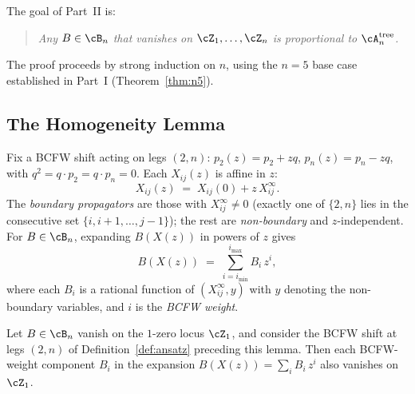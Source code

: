 The goal of Part~II is:

\begin{quote}
  \emph{Any $B \in \cB_n$ that vanishes on
  $\cZ_1, \ldots, \cZ_n$ is proportional to $\cA_n^{\mathrm{tree}}$.}
\end{quote}

\noindent
The proof proceeds by strong induction on $n$, using
the $n = 5$ base case established in Part~I (Theorem~\ref{thm:n5}).

\subsection{The Homogeneity Lemma}
\label{ssec:homogeneity}

\begin{definition}
Fix a BCFW shift acting on legs $(2,n)$:
$p_2(z) = p_2 + zq$, $p_n(z) = p_n - zq$, with
$q^2 = q\cdot p_2 = q\cdot p_n = 0$.
Each $X_{ij}(z)$ is affine in $z$:
\begin{equation}
  X_{ij}(z) \;=\; X_{ij}(0) + z\, X_{ij}^\infty.
  \label{eq:Xz}
\end{equation}
The \emph{boundary propagators} are those with
$X_{ij}^\infty \ne 0$ (exactly one of $\{2, n\}$ lies
in the consecutive set $\{i, i{+}1, \ldots, j{-}1\}$);
the rest are \emph{non-boundary} and $z$-independent.
For $B \in \cB_n$, expanding $B(X(z))$ in powers of $z$ gives
\[
  B(X(z)) \;=\; \sum_{i=i_{\min}}^{i_{\max}} B_i\, z^i,
\]
where each $B_i$ is a rational function of
$(X_{ij}^\infty, y)$ with $y$ denoting the non-boundary
variables, and $i$ is the \emph{BCFW weight}.
\end{definition}

\begin{lemma}
\label{lem:homogeneity}
Let $B \in \cB_n$ vanish on the $1$-zero locus $\cZ_1$,
and consider the BCFW shift at legs $(2, n)$ of
Definition~\ref{def:ansatz} preceding this lemma.
Then each BCFW-weight component $B_i$ in the expansion
$B(X(z)) = \sum_i B_i\, z^i$ also vanishes on $\cZ_1$.
\end{lemma}

